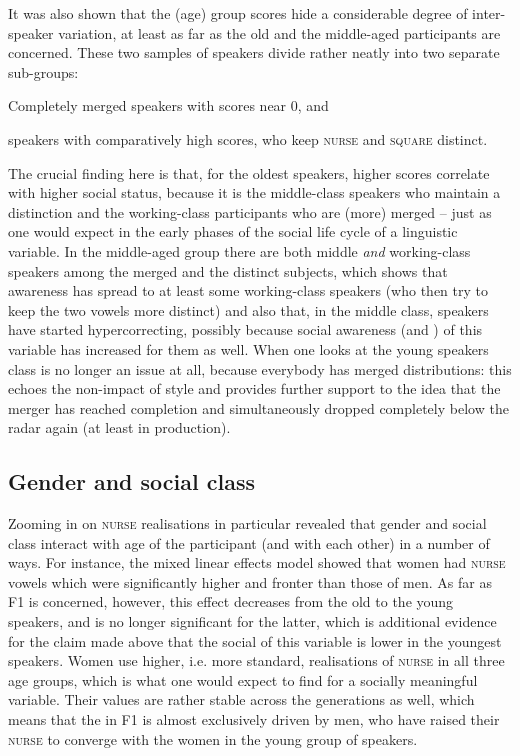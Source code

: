 It was also shown that the (age) group  scores hide a considerable degree of inter-speaker variation, at least as far as the old and the middle-aged participants are concerned.
These two samples of speakers divide rather neatly into two separate sub-groups:
\begin{inparaenum}[(1)]
	\item Completely merged speakers with  scores near 0, and
	\item speakers with comparatively high  scores, who keep \textsc{nurse} and \textsc{square} distinct.
\end{inparaenum}
The crucial finding here is that, for the oldest speakers, higher  scores correlate with higher social status, because it is the middle-class speakers who maintain a distinction and the working-class participants who are (more) merged -- just as one would expect in the early phases of the social life cycle of a linguistic variable.
In the middle-aged group there are both middle \emph{and} working-class speakers among the merged and the distinct subjects, which shows that awareness has spread to at least some working-class speakers (who then try to keep the two vowels more distinct) and also that, in the middle class, speakers have started hypercorrecting, possibly because social awareness (and ) of this variable has increased for them as well.
When one looks at the young speakers class is no longer an issue at all, because everybody has merged distributions: this echoes the non-impact of style and provides further support to the idea that the merger has reached completion and simultaneously dropped completely below the radar again (at least in production).

\subsection{Gender and social class}
\label{prod.disc.nurse.social}

Zooming in on \textsc{nurse} realisations in particular revealed that gender and social class interact with age of the participant (and with each other) in a number of ways.
For instance, the mixed linear effects model showed that women had \textsc{nurse} vowels which were significantly higher and fronter than those of men.
As far as F1 is concerned, however, this effect decreases from the old to the young speakers, and is no longer significant for the latter, which is additional evidence for the claim made above that the social  of this variable is lower in the youngest speakers.
Women use higher, i.e. more standard, realisations of \textsc{nurse} in all three age groups, which is what one would expect to find for a socially meaningful variable.
Their values are rather stable across the generations as well, which means that the   in F1 is almost exclusively driven by men, who have raised their \textsc{nurse} to converge with the women in the young group of speakers.

